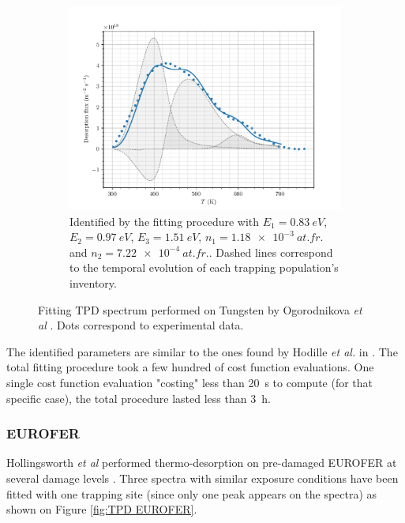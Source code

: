 \begin{figure} [ht]
\begin{subfigure}[t]{0.5\linewidth}
            \includegraphics[width=\linewidth]{Figures/Chapter3/Parametric_optimisation/Ogorodnikova_5D.pdf}
            \caption{Identified by the fitting procedure with $E_1 = \SI{0.83}{eV}$, $E_2 = \SI{0.97}{eV}$, $E_3 = \SI{1.51}{eV}$, $n_1 = \SI{1.18e-3}{at.fr.}$ and \newline $n_2 = \SI{7.22e-4}{at.fr.}$.  Dashed lines correspond to the temporal evolution of each trapping population's inventory.}
            \label{fig:5D TPD}
        \end{subfigure}%
    \caption{Fitting TPD spectrum performed on Tungsten by Ogorodnikova \textit{et  al} \cite{ogorodnikova_deuterium_2003}. Dots correspond to experimental data.}
    \label{fig:TPD ogorodnikova}
\end{figure}
The identified parameters are similar to the ones found by Hodille \textit{et al.} in .
The total fitting procedure took a few hundred of cost function evaluations.
One single cost function evaluation "costing" less than \SI{20}{s} to compute (for that specific case), the total procedure lasted less than \SI{3}{h}.

\subsubsection{EUROFER}

Hollingsworth \textit{et al} performed thermo-desorption on pre-damaged EUROFER at several damage levels .
Three spectra with similar exposure conditions have been fitted with one trapping site (since only one peak appears on the spectra) as shown on Figure \ref{fig:TPD EUROFER}.

